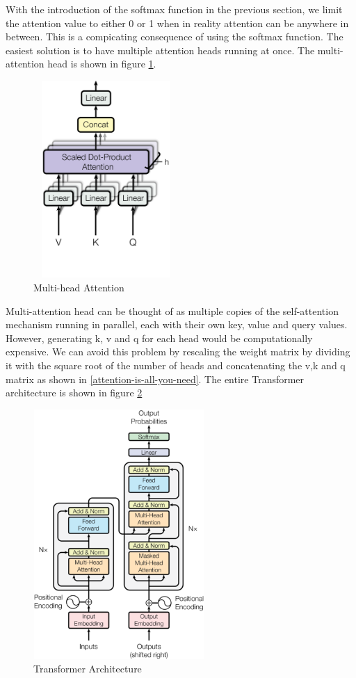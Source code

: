 With the introduction of the softmax function in the previous section, we limit the attention value to either 0 or 1 when in reality attention can be anywhere in between. This is a compicating consequence of using the softmax function. The easiest solution is to have multiple attention heads running at once. The multi-attention head is shown in figure \ref{fig:multi-head}.

\begin{figure}[ht]
\includegraphics[width=5.5cm, height=7.5cm]{images/multi-head attention.png}
\centering
\caption{Multi-head Attention}
\label{fig:multi-head}
\end{figure}
\FloatBarrier

Multi-attention head can be thought of as multiple copies of the self-attention mechanism running in parallel, each with their own key, value and query values. However, generating k, v and q for each head would be computationally expensive. We can avoid this problem by rescaling the weight matrix by dividing it with the square root of the number of heads and concatenating the v,k and q matrix as shown in \ref{attention-is-all-you-need}. The entire Transformer architecture is shown in figure \ref{fig:transformer-architecture}

\begin{figure}[ht]
\includegraphics[width=6.5cm, height=9.5cm]{images/transformer_architecture.png}
\centering
\caption{Transformer Architecture}
\label{fig:transformer-architecture}
\end{figure}
\FloatBarrier

